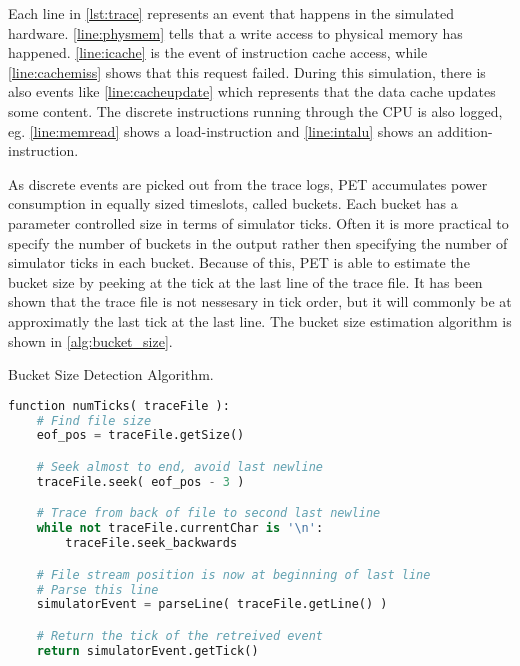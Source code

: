 Each line in \autoref{lst:trace} represents an event that happens in the
simulated hardware.  \autoref{line:physmem} tells that a write access to
physical memory has happened. \autoref{line:icache} is the event of instruction
cache access, while \autoref{line:cachemiss} shows that this request failed.
During this simulation, there is also events like \autoref{line:cacheupdate}
which represents that the data cache updates some content. The discrete
instructions running through the CPU is also logged, eg. \autoref{line:memread}
shows a load-instruction and \autoref{line:intalu} shows an
addition-instruction.

As discrete events are picked out from the trace logs, PET accumulates power
consumption in equally sized timeslots, called buckets. Each bucket has a
parameter controlled size in terms of simulator ticks. Often it is more
practical to specify the number of buckets in the output rather then specifying
the number of simulator ticks in each bucket. Because of this, PET is able to
estimate the bucket size by peeking at the tick at the last line of the trace
file. It has been shown that the trace file is not nessesary in tick order,
but it will commonly be at approximatly the last tick at the last line. The
bucket size estimation algorithm is shown in \autoref{alg:bucket_size}.

\begin{algorithm}
    \caption{Bucket Size Detection Algorithm.}
    \label{alg:bucket_size}
%
    \begin{lstlisting}[language=Python,style=algo]
function numTicks( traceFile ):
    # Find file size
    eof_pos = traceFile.getSize()

    # Seek almost to end, avoid last newline
    traceFile.seek( eof_pos - 3 )

    # Trace from back of file to second last newline
    while not traceFile.currentChar is '\n':
        traceFile.seek_backwards

    # File stream position is now at beginning of last line
    # Parse this line
    simulatorEvent = parseLine( traceFile.getLine() )

    # Return the tick of the retreived event
    return simulatorEvent.getTick()
    \end{lstlisting}
\end{algorithm}

